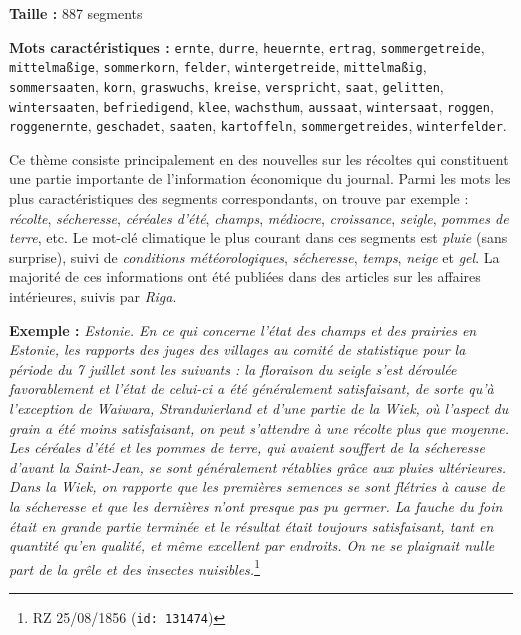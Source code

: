 \documentclass[a4paper,twoside,12pt]{article}
\begin{document}
\begin{flushleft}
\textbf{Taille :} 887 segments

\textbf{Mots caractéristiques :} \texttt{ernte}, \texttt{durre}, \texttt{heuernte}, \texttt{ertrag}, \texttt{sommergetreide}, \texttt{mittelmaßige}, \texttt{sommerkorn}, \texttt{felder}, \texttt{wintergetreide}, \texttt{mittelmaßig}, \texttt{sommersaaten}, \texttt{korn}, \texttt{graswuchs}, \texttt{kreise}, \texttt{verspricht}, \texttt{saat}, \texttt{gelitten}, \texttt{wintersaaten}, \texttt{befriedigend}, \texttt{klee}, \texttt{wachsthum}, \texttt{aussaat}, \texttt{wintersaat}, \texttt{roggen}, \texttt{roggenernte}, \texttt{geschadet}, \texttt{saaten}, \texttt{kartoffeln}, \texttt{sommergetreides}, \texttt{winterfelder}.
\end{flushleft}

\noindent Ce thème consiste principalement en des nouvelles sur les récoltes qui constituent une partie importante de l'information économique du journal. Parmi les mots les plus caractéristiques des segments correspondants, on trouve par exemple : \textit{récolte}, \textit{sécheresse}, \textit{céréales d'été}, \textit{champs}, \textit{médiocre}, \textit{croissance}, \textit{seigle}, \textit{pommes de terre}, etc.  Le mot-clé climatique le plus courant dans ces segments est \textit{pluie} (sans surprise), suivi de \textit{conditions météorologiques}, \textit{sécheresse}, \textit{temps}, \textit{neige} et \textit{gel}. La majorité de ces informations ont été publiées dans des articles sur les affaires intérieures, suivis par \textit{Riga}.

\medskip

\noindent \textbf{Exemple :} \textit{Estonie. En ce qui concerne l'état des champs et des prairies en Estonie, les rapports des juges des villages au comité de statistique pour la période du 7 juillet sont les suivants : la floraison du seigle s'est déroulée favorablement et l'état de celui-ci a été généralement satisfaisant, de sorte qu'à l'exception de Waiwara, Strandwierland et d'une partie de la Wiek, où l'aspect du grain a été moins satisfaisant, on peut s'attendre à une récolte plus que moyenne. Les céréales d'été et les pommes de terre, qui avaient souffert de la sécheresse d'avant la Saint-Jean, se sont généralement rétablies grâce aux pluies ultérieures. Dans la Wiek, on rapporte que les premières semences se sont flétries à cause de la sécheresse et que les dernières n'ont presque pas pu germer. La fauche du foin était en grande partie terminée et le résultat était toujours satisfaisant, tant en quantité qu'en qualité, et même excellent par endroits. On ne se plaignait nulle part de la grêle et des insectes nuisibles.}\footnote{RZ 25/08/1856 (\texttt{id: 131474})}
\end{document}

